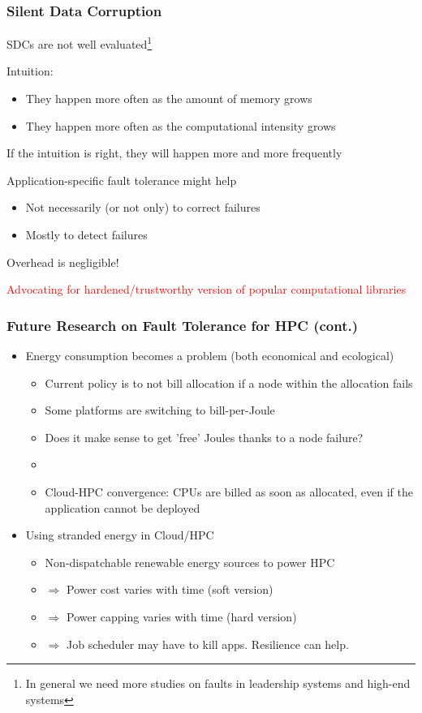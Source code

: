 \begin{frame}
  \frametitle{Silent Data Corruption}

  SDCs are not well evaluated\footnote{In general we need more studies on faults in leadership systems and high-end systems}

  Intuition:
  \begin{itemize}
  \item They happen more often as the amount of memory grows
  \item They happen more often as the computational intensity grows
  \end{itemize}

  If the intuition is right, they will happen more and more frequently

  Application-specific fault tolerance might help
  \begin{itemize}
  \item Not necessarily (or not only) to correct failures
  \item Mostly to detect failures
  \end{itemize}

  Overhead is negligible!

  \begin{center}
    \textcolor{red}{Advocating for hardened/trustworthy version of popular computational libraries}
  \end{center}  
\end{frame}

\begin{frame}
  \frametitle{Future Research on Fault Tolerance for HPC (cont.)}

  \begin{itemize}
  \item Energy consumption becomes a problem (both economical and ecological)
    \begin{itemize}
    \item Current policy is to not bill allocation if a node within the allocation fails
    \item Some platforms are switching to bill-per-Joule
    \item Does it make sense to get 'free' Joules thanks to a node failure?
    \item[] ~
    \item Cloud-HPC convergence: CPUs are billed as soon as allocated, even if the application cannot be deployed
    \end{itemize}
  \item Using stranded energy in Cloud/HPC
    \begin{itemize}
    \item Non-dispatchable renewable energy sources to power HPC
    \item $\Rightarrow$ Power cost varies with time (soft version)
    \item $\Rightarrow$ Power capping varies with time (hard version)
    \item $\Rightarrow$ Job scheduler may have to kill apps. Resilience can help.
    \end{itemize}
  \end{itemize}
\end{frame}


